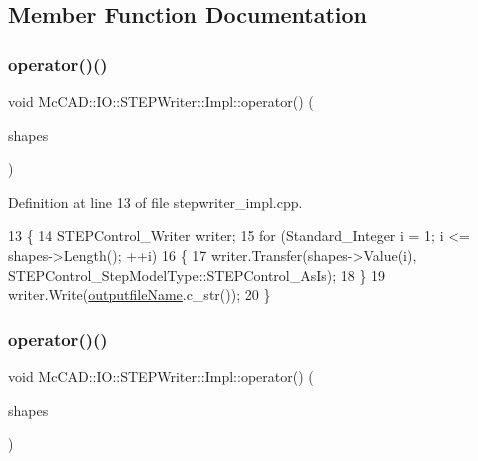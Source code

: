\subsection{Member Function Documentation}
\mbox{\label{classMcCAD_1_1IO_1_1STEPWriter_1_1Impl_a0ffef02c0b5c8d9d2ef6dd8bba026ec1}} 
\subsubsection{\texorpdfstring{operator()()}{operator()()}\hspace{0.1cm}{\footnotesize\ttfamily [1/2]}}
{\footnotesize\ttfamily void Mc\+C\+A\+D\+::\+I\+O\+::\+S\+T\+E\+P\+Writer\+::\+Impl\+::operator() (\begin{DoxyParamCaption}\item[{const Handle\+\_\+\+Top\+Tools\+\_\+\+H\+Sequence\+Of\+Shape \&}]{shapes }\end{DoxyParamCaption})}



Definition at line 13 of file stepwriter\+\_\+impl.\+cpp.


\begin{DoxyCode}
13                                                                                \{
14   STEPControl\_Writer writer;
15   \textcolor{keywordflow}{for} (Standard\_Integer i = 1; i <= shapes->Length(); ++i)
16     \{
17       writer.Transfer(shapes->Value(i), STEPControl\_StepModelType::STEPControl\_AsIs);
18     \}
19   writer.Write(\hyperlink{classMcCAD_1_1IO_1_1STEPWriter_1_1Impl_ae943ccd3f778c6c211f67be535fdc93f}{outputfileName}.c\_str());
20 \}
\end{DoxyCode}
\mbox{\label{classMcCAD_1_1IO_1_1STEPWriter_1_1Impl_a0ffef02c0b5c8d9d2ef6dd8bba026ec1}} 
\subsubsection{\texorpdfstring{operator()()}{operator()()}\hspace{0.1cm}{\footnotesize\ttfamily [2/2]}}
{\footnotesize\ttfamily void Mc\+C\+A\+D\+::\+I\+O\+::\+S\+T\+E\+P\+Writer\+::\+Impl\+::operator() (\begin{DoxyParamCaption}\item[{const Handle\+\_\+\+Top\+Tools\+\_\+\+H\+Sequence\+Of\+Shape \&}]{shapes }\end{DoxyParamCaption})}



